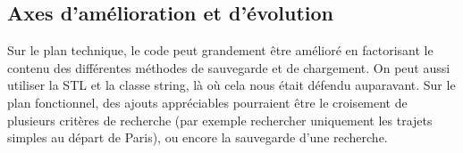 \documentclass[a4paper]{article}
\begin{document}
\subsection{Axes d'amélioration et d'évolution}

Sur le plan technique, le code peut grandement être amélioré en factorisant le contenu des différentes méthodes de sauvegarde et de chargement. On peut aussi utiliser la STL et la classe string, là où cela nous était défendu auparavant.
Sur le plan fonctionnel, des ajouts appréciables pourraient être le croisement de plusieurs critères de recherche (par exemple rechercher uniquement les trajets simples au départ de Paris), ou encore la sauvegarde d'une recherche.










\end{document}
